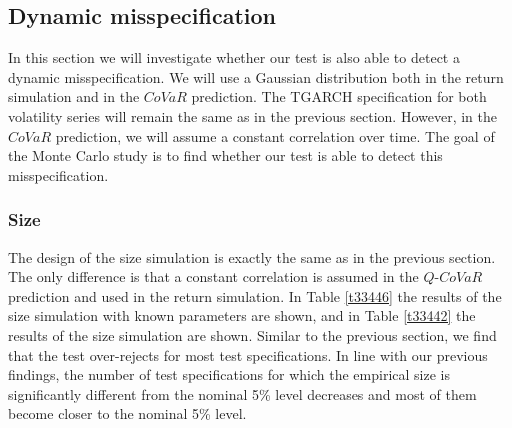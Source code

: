 \documentclass[12pt]{article}
\begin{document}

\subsection{Dynamic misspecification} \label{dynmis}

In this section we will investigate whether our test is also able to detect a dynamic misspecification. We will use a Gaussian distribution both in the return simulation and in the $CoVaR$ prediction. The TGARCH specification for both volatility series will remain the same as in the previous section. However, in the $CoVaR$ prediction, we will assume a constant correlation over time. The goal of the Monte Carlo study is to find whether our test is able to detect this misspecification.


\subsubsection{Size}

The design of the size simulation is exactly the same as in the previous section. The only difference is that a constant correlation is assumed in the $Q$-$CoVaR$ prediction and used in the return simulation. In Table \ref{t33446} the results of the size simulation with known parameters are shown, and in Table \ref{t33442} the results of the size simulation are shown. Similar to the previous section, we find that the test over-rejects for most test specifications. In line with our previous findings, the number of test specifications for which the empirical size is significantly different from the nominal 5\% level decreases and most of them become closer to the nominal 5\% level.
\end{document}
